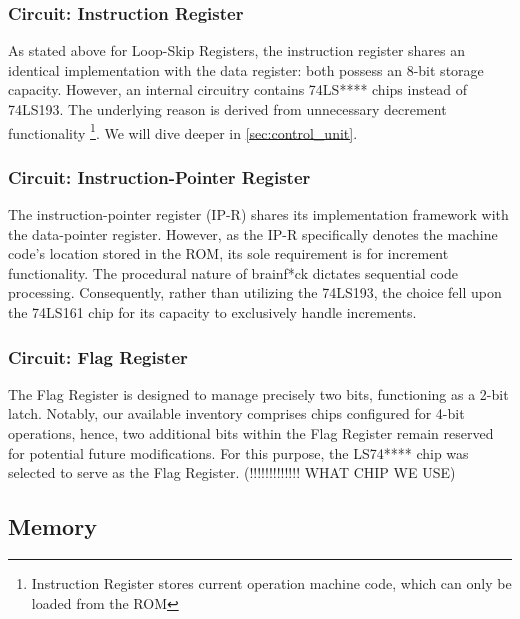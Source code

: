 \subsubsection{Circuit: Instruction Register} \label{sec:implementation:registers:instruction}
As stated above for Loop-Skip Registers, the instruction register shares an identical implementation with the data register: both possess an 8-bit storage capacity. However, an internal circuitry contains 74LS**** chips instead of 74LS193. The underlying reason is derived from unnecessary decrement functionality \footnote{Instruction Register stores current operation machine code, which can only be loaded from the ROM}. We will dive deeper in \ref{sec:control_unit}.

\subsubsection{Circuit: Instruction-Pointer Register}
The instruction-pointer register (IP-R) shares its implementation framework with the data-pointer register. However, as the IP-R specifically denotes the machine code's location stored in the ROM, its sole requirement is for increment functionality. The procedural nature of brainf*ck dictates sequential code processing. Consequently, rather than utilizing the 74LS193, the choice fell upon the 74LS161 chip for its capacity to exclusively handle increments.

\subsubsection{Circuit: Flag Register}
The Flag Register is designed to manage precisely two bits, functioning as a 2-bit latch. Notably, our available inventory comprises chips configured for 4-bit operations, hence, two additional bits within the Flag Register remain reserved for potential future modifications. For this purpose, the LS74**** chip was selected to serve as the Flag Register. (!!!!!!!!!!!!! WHAT CHIP WE USE)


\subsection{Memory} \label{sec:implementation:memory}
